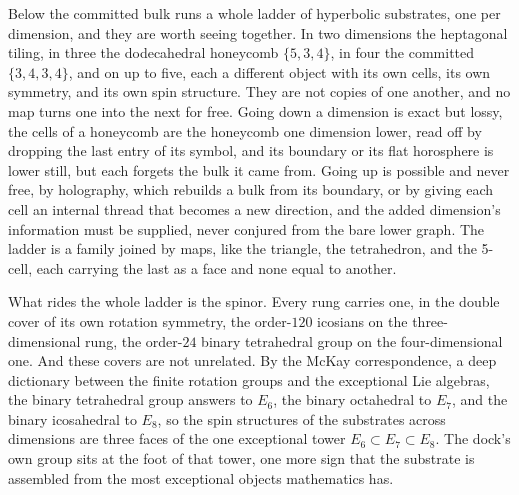 Below the committed bulk runs a whole ladder of hyperbolic substrates, one per dimension, and they are worth seeing together. In two dimensions the heptagonal tiling, in three the dodecahedral honeycomb $\{5,3,4\}$, in four the committed $\{3,4,3,4\}$, and on up to five, each a different object with its own cells, its own symmetry, and its own spin structure. They are not copies of one another, and no map turns one into the next for free. Going down a dimension is exact but lossy, the cells of a honeycomb are the honeycomb one dimension lower, read off by dropping the last entry of its symbol, and its boundary or its flat horosphere is lower still, but each forgets the bulk it came from. Going up is possible and never free, by holography, which rebuilds a bulk from its boundary, or by giving each cell an internal thread that becomes a new direction, and the added dimension's information must be supplied, never conjured from the bare lower graph. The ladder is a family joined by maps, like the triangle, the tetrahedron, and the 5-cell, each carrying the last as a face and none equal to another.

What rides the whole ladder is the spinor. Every rung carries one, in the double cover of its own rotation symmetry, the order-$120$ icosians on the three-dimensional rung, the order-$24$ binary tetrahedral group on the four-dimensional one. And these covers are not unrelated. By the McKay correspondence, a deep dictionary between the finite rotation groups and the exceptional Lie algebras, the binary tetrahedral group answers to $E_6$, the binary octahedral to $E_7$, and the binary icosahedral to $E_8$, so the spin structures of the substrates across dimensions are three faces of the one exceptional tower $E_6 \subset E_7 \subset E_8$. The dock's own group sits at the foot of that tower, one more sign that the substrate is assembled from the most exceptional objects mathematics has.
